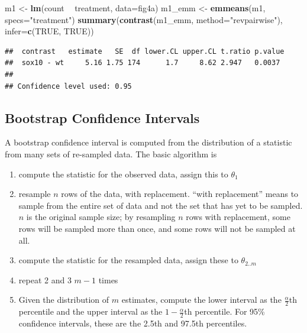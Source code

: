 \documentclass[]{book}
\newenvironment{Shaded}{\begin{snugshade}}{\end{snugshade}}
\newcommand{\KeywordTok}[1]{\textcolor[rgb]{0.13,0.29,0.53}{\textbf{#1}}}
\newcommand{\DataTypeTok}[1]{\textcolor[rgb]{0.13,0.29,0.53}{#1}}
\newcommand{\StringTok}[1]{\textcolor[rgb]{0.31,0.60,0.02}{#1}}
\newcommand{\OtherTok}[1]{\textcolor[rgb]{0.56,0.35,0.01}{#1}}
\newcommand{\OperatorTok}[1]{\textcolor[rgb]{0.81,0.36,0.00}{\textbf{#1}}}
\newcommand{\NormalTok}[1]{#1}
\providecommand{\tightlist}{%
  \setlength{\itemsep}{0pt}\setlength{\parskip}{0pt}}
\begin{document}
\begin{Shaded}
\begin{Highlighting}[]
\NormalTok{m1 <-}\StringTok{ }\KeywordTok{lm}\NormalTok{(count }\OperatorTok{~}\StringTok{ }\NormalTok{treatment, }\DataTypeTok{data=}\NormalTok{fig4a)}
\NormalTok{m1_emm <-}\StringTok{ }\KeywordTok{emmeans}\NormalTok{(m1, }\DataTypeTok{specs=}\StringTok{"treatment"}\NormalTok{)}
\KeywordTok{summary}\NormalTok{(}\KeywordTok{contrast}\NormalTok{(m1_emm, }\DataTypeTok{method=}\StringTok{"revpairwise"}\NormalTok{),}
        \DataTypeTok{infer=}\KeywordTok{c}\NormalTok{(}\OtherTok{TRUE}\NormalTok{, }\OtherTok{TRUE}\NormalTok{))}
\end{Highlighting}
\end{Shaded}

\begin{verbatim}
##  contrast   estimate   SE  df lower.CL upper.CL t.ratio p.value
##  sox10 - wt     5.16 1.75 174      1.7     8.62 2.947   0.0037 
## 
## Confidence level used: 0.95
\end{verbatim}

\subsection{Bootstrap Confidence
Intervals}\label{bootstrap-confidence-intervals}

A bootstrap confidence interval is computed from the distribution of a
statistic from many sets of re-sampled data. The basic algorithm is

\begin{enumerate}
\def\labelenumi{\arabic{enumi}.}
\tightlist
\item
  compute the statistic for the observed data, assign this to
  \(\theta_1\)
\item
  resample \(n\) rows of the data, with replacement. ``with
  replacement'' means to sample from the entire set of data and not the
  set that has yet to be sampled. \(n\) is the original sample size; by
  resampling \(n\) rows with replacement, some rows will be sampled more
  than once, and some rows will not be sampled at all.
\item
  compute the statistic for the resampled data, assign these to
  \(\theta_{2..m}\)
\item
  repeat 2 and 3 \(m-1\) times
\item
  Given the distribution of \(m\) estimates, compute the lower interval
  as the \(\frac{\alpha}{2}\)th percentile and the upper interval as the
  \(1 - \frac{\alpha}{2}\)th percentile. For 95\% confidence intervals,
  these are the 2.5th and 97.5th percentiles.
\end{enumerate}
\end{document}
